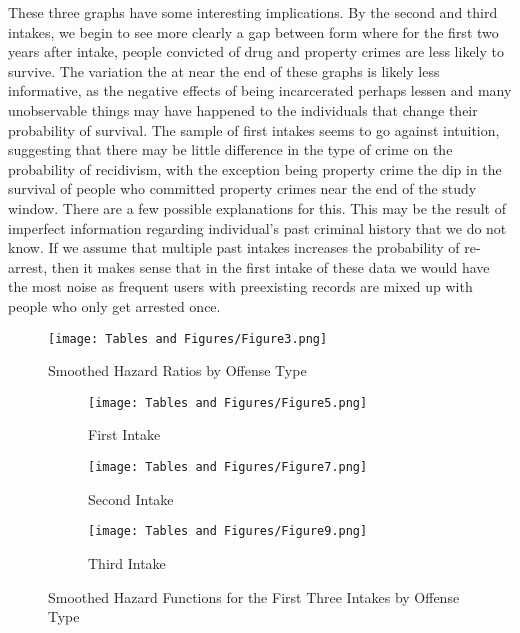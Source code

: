 \documentclass{article}
\begin{document}
These three graphs have some interesting implications. By the second and third intakes, we begin to see more clearly a gap between form where for the first two years after intake, people convicted of drug and property crimes are less likely to survive. The variation the at near the end of these graphs is likely less informative, as the negative effects of being incarcerated perhaps lessen and many unobservable things may have happened to the individuals that change their probability of survival.  The sample of first intakes seems to go against intuition, suggesting that there may be little difference in the type of crime on the probability of recidivism, with the exception being property crime the dip in the survival of people who committed property crimes near the end of the study window. There are a few possible explanations for this. This may be the result of imperfect information regarding individual's past criminal history that we do not know. If we assume that multiple past intakes increases the probability of re-arrest, then it makes sense that in the first intake of these data we would have the most noise as frequent users with preexisting records are mixed up with people who only get arrested once. 


\begin{figure}[t]
    \centering
    \texttt{[image: Tables and Figures/Figure3.png]}
    \caption{Smoothed Hazard Ratios by Offense Type}
    \label{fig4}
\end{figure}

\begin{figure}[h!]
     \centering
     \begin{subfigure}[h]{0.45\textwidth}
         \centering
         \texttt{[image: Tables and Figures/Figure5.png]}
         \caption{First Intake}
         \label{fig5a}
     \end{subfigure}
     \hfill
     \begin{subfigure}[h]{0.45\textwidth}
         \centering
         \texttt{[image: Tables and Figures/Figure7.png]}
         \caption{Second Intake}
         \label{fig5b}
     \end{subfigure}
     \hfill
     \begin{subfigure}[h]{0.45\textwidth}
         \centering
         \texttt{[image: Tables and Figures/Figure9.png]}
         \caption{Third Intake}
         \label{fig5c}
     \end{subfigure}
        \caption{Smoothed Hazard Functions for the First Three Intakes by Offense Type}
        \label{fig5}
    \end{figure}
    
\end{document}

